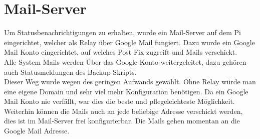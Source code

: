 \section{Mail-Server}
Um Statusbenachrichtigungen zu erhalten, wurde ein Mail-Server auf dem Pi eingerichtet, welcher als Relay über Google Mail fungiert. Dazu wurde ein Google Mail Konto eingerichtet, auf welches Post Fix zugreift und Mails verschickt.\\
Alle System Mails werden Über das Google-Konto weitergeleitet, dazu gehören auch Statusmeldungen des Backup-Skripts.\\
Dieser Weg wurde wegen des geringen Aufwands gewählt. Ohne Relay würde man eine eigene Domain und sehr viel mehr Konfiguration benötigen. Da ein Google Mail Konto nie verfällt, war dies die beste und pflegeleichteste Möglichkeit.\\
Weiterhin können die Mails auch an jede beliebige Adresse verschickt werden, dies ist im Mail-Server frei konfigurierbar. Die Mails gehen momentan an die Google Mail Adresse.

